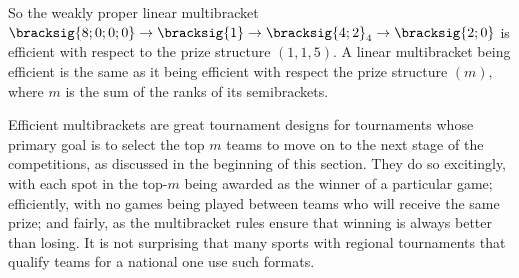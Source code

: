 {    So the weakly proper linear multibracket $\bracksig{8;0;0;0} \to \bracksig{1} \to \bracksig{4;2}_4 \to \bracksig{2;0}$ is efficient with respect to the prize structure $(1, 1, 5).$ A linear multibracket being efficient is the same as it being efficient with respect the prize structure $(m),$ where $m$ is the sum of the ranks of its semibrackets.

    Efficient multibrackets are great tournament designs for tournaments whose primary goal is to select the top $m$ teams to move on to the next stage of the competitions, as discussed in the beginning of this section. They do so excitingly, with each spot in the top-$m$ being awarded as the winner of a particular game; efficiently, with no games being played between teams who will receive the same prize; and fairly, as the multibracket rules ensure that winning is always better than losing. It is not surprising that many sports with regional tournaments that qualify teams for a national one use such formats.
}
